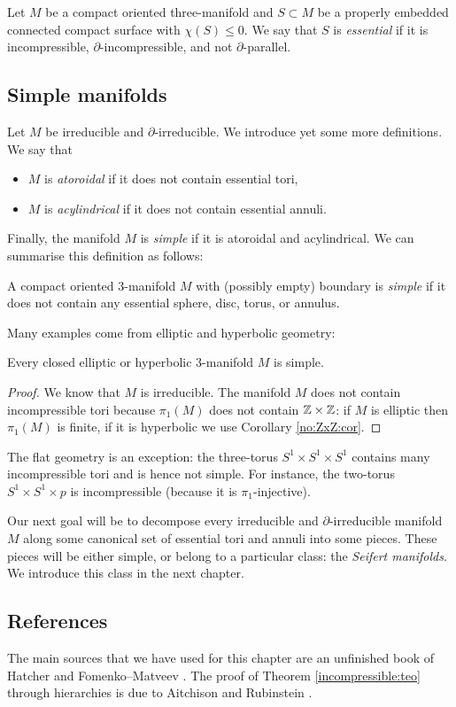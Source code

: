 Let $M$ be a compact oriented three-manifold and $S\subset M$ be a properly embedded connected compact surface with $\chi(S)\leqslant 0$. We say that $S$ is \emph{essential} if it is incompressible, $\partial$-incompressible, and not $\partial$-parallel.

\subsection{Simple manifolds} \label{simple:manifold:subsection}
Let $M$ be irreducible and $\partial$-irreducible. We introduce yet some more definitions. We say that
\begin{itemize}
\item $M$ is \emph{atoroidal} if it does not contain essential tori,
\item $M$ is \emph{acylindrical} if it does not contain essential annuli.
\end{itemize}

Finally, the manifold $M$ is \emph{simple} if it is atoroidal and acylindrical. We can summarise this definition as follows:

\begin{defn} A compact oriented 3-manifold $M$ with (possibly empty) boundary is \emph{simple} if it does not contain any essential sphere, disc, torus, or annulus.
\end{defn}

Many examples come from elliptic and hyperbolic geometry:

\begin{prop}
Every closed elliptic or hyperbolic 3-manifold $M$ is simple.
\end{prop}
\begin{proof}
We know that $M$ is irreducible. The manifold $M$ does not contain incompressible tori because $\pi_1(M)$ does not contain $\mathbb{Z} \times \mathbb{Z}$: if $M$ is elliptic then $\pi_1(M)$ is finite, if it is hyperbolic we use Corollary \ref{no:ZxZ:cor}.
\end{proof}

The flat geometry is an exception: the three-torus $S^1\times S^1\times S^1$ contains many incompressible tori and is hence not simple. For instance, the two-torus $S^1\times S^1 \times p$ is incompressible (because it is $\pi_1$-injective).

Our next goal will be to decompose every irreducible and $\partial$-irreducible manifold $M$ along some canonical set of essential tori and annuli into some pieces. These pieces will be either simple, or belong to a particular class: the \emph{Seifert manifolds}. We introduce this class in the next chapter. 

\subsection{References}
The main sources that we have used for this chapter are an unfinished book of Hatcher \cite{H} and Fomenko--Matveev \cite{FoMa}. The proof of Theorem \ref{incompressible:teo} through hierarchies is due to Aitchison and Rubinstein \cite{AR}.


